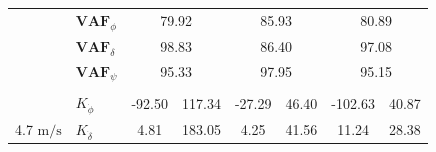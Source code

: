 \begin{table}[]
\begin{tabular}{llcccccc}
                                                   & $\mathbf{VAF}_\phi$                                                & \multicolumn{2}{c}{79.92}                                                                         & \multicolumn{2}{c}{85.93}                                                                         & \multicolumn{2}{c}{80.89}                                                                         \\
                                                   & $\mathbf{VAF}_\delta$                                              & \multicolumn{2}{c}{98.83}                                                                         & \multicolumn{2}{c}{86.40}                                                                         & \multicolumn{2}{c}{97.08}                                                                         \\
                                                   & $\mathbf{VAF}_\psi$                                                & \multicolumn{2}{c}{95.33}                                                                         & \multicolumn{2}{c}{97.95}                                                                         & \multicolumn{2}{c}{95.15}                                                                         \\
                                                   &                                                                    & \multicolumn{1}{l}{}                        & \multicolumn{1}{l}{}                                & \multicolumn{1}{l}{}                        & \multicolumn{1}{l}{}                                & \multicolumn{1}{l}{}                        & \multicolumn{1}{l}{}                                \\ \hline
                                                   & $K_{\dot{\phi}} $                                                  & -92.50                                      & 117.34                                              & -27.29                                      & 46.40                                               & -102.63                                     & 40.87                                               \\
    \multirow{-2}{*}{4.7 $\si{\meter\per\second}$} & $K_{\dot{\delta}}$                                                 & 4.81                                        & 183.05                                              & 4.25                                        & 41.56                                               & 11.24                                       & 28.38                                               \\

\end{tabular}
\end{table}

